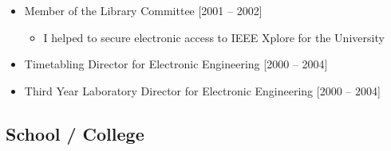 \documentclass[10pt,a4paper]{res} %
\begin{document}
\begin{resume}
\begin{itemize}
\begin{itemize}
\end{itemize}
\item Member of the Library Committee [2001 -- 2002]
\begin{itemize} \itemsep -2pt
\item I helped to secure electronic access to IEEE Xplore for the University
\end{itemize}
\item Timetabling Director for Electronic Engineering [2000 -- 2004]
\item Third Year Laboratory Director for Electronic Engineering [2000 -- 2004]
\end{itemize}

\subsection*{School / College}


\end{resume}
\end{document}
